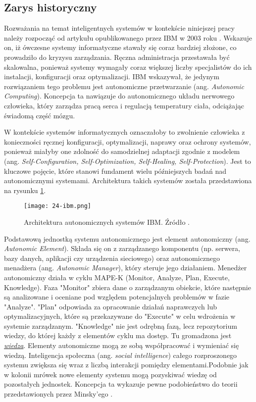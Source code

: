 \subsection{Zarys historyczny}
Rozważania na temat inteligentnych systemów w kontekście niniejszej pracy należy rozpocząć od artykułu opublikowanego przez IBM w 2003 roku \cite{kephart2003}. Wskazuje on, iż ówczesne systemy informatyczne stawały się coraz bardziej złożone, co prowadziło do kryzysu zarządzania. Ręczna administracja przestawała być skalowalna, ponieważ systemy wymagały coraz większej liczby specjalistów do ich instalacji, konfiguracji oraz optymalizacji. IBM wskazywał, że jedynym rozwiązaniem tego problemu jest autonomiczne przetwarzanie (ang. \textit{Autonomic Computing}). Koncepcja ta nawiązuje do autonomicznego układu nerwowego człowieka, który zarządza pracą serca i regulacją temperatury ciała, odciążając świadomą część mózgu.

W kontekście systemów informatycznych oznaczałoby to zwolnienie człowieka z konieczności ręcznej konfiguracji, optymalizacji, naprawy oraz ochrony systemów, ponieważ miałyby one zdolność do samodzielnej adaptacji zgodnie z modelem (ang. \textit{Self-Configuration, Self-Optimization, Self-Healing, Self-Protection}). Jest to kluczowe pojęcie, które stanowi fundament wielu późniejszych badań nad autonomicznymi systemami. Architektura takich systemów została przedstawiona na rysunku \ref{fig:24-ibm}.

\begin{figure}[!htbp]
    \centering \texttt{[image: 24-ibm.png]}
    \caption{Architektura autonomicznych systemów IBM. Źródło \cite{kephart2003}.}\label{fig:24-ibm}
\end{figure}

Podstawową jednostką systemu autonomicznego jest element autonomiczny (ang. \textit{Autonomic Element}). Składa się on z zarządzanego komponentu (np. serwera, bazy danych, aplikacji czy urządzenia sieciowego) oraz autonomicznego menadżera (ang. \textit{Autonomic Manager}), który steruje jego działaniem. Menedżer autonomiczny działa w cyklu MAPE-K (Monitor, Analyze, Plan, Execute, Knowledge). Faza "Monitor" zbiera dane o zarządzanym obiekcie, które następnie są analizowane i oceniane pod względem potencjalnych problemów w fazie "Analyze". "Plan" odpowiada za opracowanie działań naprawczych lub optymalizacyjnych, które są przekazywane do "Execute" w celu wdrożenia w systemie zarządzanym. "Knowledge" nie jest odrębną fazą, lecz repozytorium wiedzy, do której każdy z elementów cyklu ma dostęp. Tu gromadzona jest \hyperlink{def:wiedza}{\textit{wiedza}}. Elementy autonomiczne mogą ze sobą współpracować i wymieniać się wiedzą. Inteligencja społeczna (ang. \textit{social intelligence}) całego rozproszonego systemu zwiększa się wraz z liczbą interakcji pomiędzy elementami.Podobnie jak w kolonii mrówek nowe elementy systemu mogą pozyskiwać wiedzę od pozostałych jednostek. Koncepcja ta wykazuje pewne podobieństwo do teorii przedstawionych przez Minsky'ego \cite{minsky1986}.

